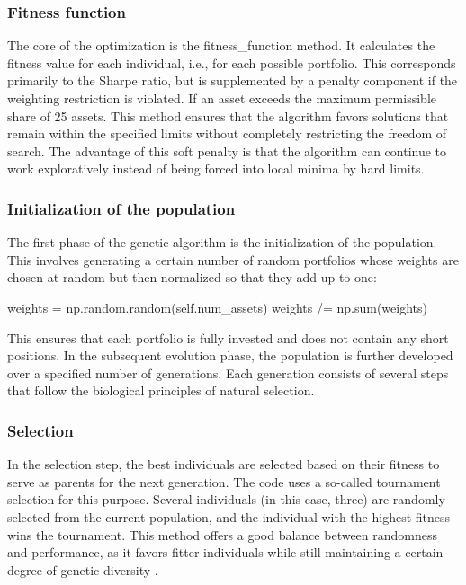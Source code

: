 \documentclass{agasthesis}
\begin{document}
\subsubsection{Fitness function}
The core of the optimization is the fitness_function method. It calculates the fitness value for each individual, i.e., for each possible portfolio. 
This corresponds primarily to the Sharpe ratio, but is supplemented by a penalty component if the weighting restriction is violated. If an asset exceeds 
the maximum permissible share of 25%
assets. This method ensures that the algorithm favors solutions that remain within the specified limits without completely restricting the freedom of search. The advantage of this 
soft penalty is that the algorithm can continue to work exploratively instead of being forced into local minima by hard limits.
\subsubsection{Initialization of the population}
The first phase of the genetic algorithm is the initialization of the population. This involves generating a certain number of random portfolios whose weights are chosen at random but then normalized so that they add up to one:

weights = np.random.random(self.num_assets)
weights /= np.sum(weights)

This ensures that each portfolio is fully invested and does not contain any short positions. In the subsequent evolution phase, the population is further developed over a specified number of generations. Each generation consists of several steps that follow the biological principles of natural selection.

\subsubsection{Selection}
In the selection step, the best individuals are selected based on their fitness to serve as parents for the next generation. The code uses a so-called tournament selection for this purpose. 
Several individuals (in this case, three) are randomly selected from the current population, and the individual with the highest fitness wins the tournament. This method offers a good balance 
between randomness and performance, as it favors fitter individuals while still maintaining a certain degree of genetic diversity \cite[p. 193]{miller_genetic_1995}. 
\end{document}

